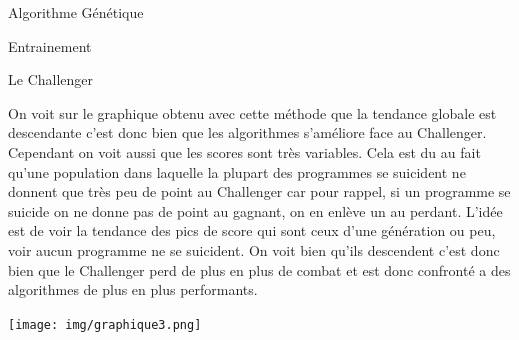 \documentclass[a4paper, 10pt]{article}
\begin{document}
\begin{section}{Algorithme Génétique}
\begin{subsection}{Entrainement}
\begin{subsubsection}{Le Challenger}
                        \bigskip
                    \par
                        On voit sur le graphique obtenu avec cette méthode que la tendance globale est descendante c'est donc bien que les algorithmes s'améliore face au Challenger. Cependant on voit aussi que les scores sont très variables. Cela est du au fait qu'une population dans laquelle la plupart des programmes se suicident ne donnent que très peu de point au Challenger car pour rappel, si un programme se suicide on ne donne pas de point au gagnant, on en enlève un au perdant. L'idée est de voir la tendance des pics de score qui sont ceux d'une génération ou peu, voir aucun programme ne se suicident. On voit bien qu'ils descendent c'est donc bien que le Challenger perd de plus en plus de combat et est donc confronté a des algorithmes de plus en plus performants.

                        \bigskip
                        \texttt{[image: img/graphique3.png]}
                        \centering
                        
                    \bigskip
                \end{subsubsection}  
                
        \end{subsection}

    \end{section}
\end{document}
